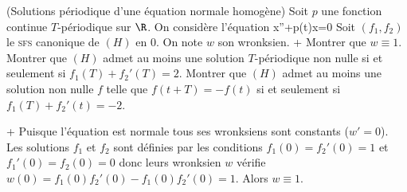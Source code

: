 \begin{exer}(Solutions périodique d'une équation normale homogène)
Soit $p$ une fonction continue $T$-périodique sur $\R$. On considère l'équation
\< x''+p(t)x=0\>
Soit $(f_1,f_2)$ le \textsc{sfs} canonique de $(H)$ en $0$. On note $w$ son wronksien.
\xit+ Montrer que $w\equiv 1$.
\xit Montrer que $(H)$ admet au moins une solution $T$-périodique non nulle si et seulement si $f_1(T)+f_2'(T)=2$.
\xit Montrer que $(H)$ admet au moins une solution non nulle $f$ telle que $f(t+T)=-f(t)$ si et seulement si $f_1(T)+f_2'(t)=-2$.
\exit

\solution
\xit+ Puisque l'équation est normale tous ses wronksiens sont constants ($w'=0$). Les solutions $f_1$ et $f_2$ sont définies par les conditions $f_1(0)=f_2'(0)=1$ et $f_1'(0)=f_2(0)=0$ donc leurs wronksien $w$  vérifie $w(0)=f_1(0)f_2'(0)-f_1(0)f_2'(0)=1$. Alors $w\equiv1$.


\end{exer}
